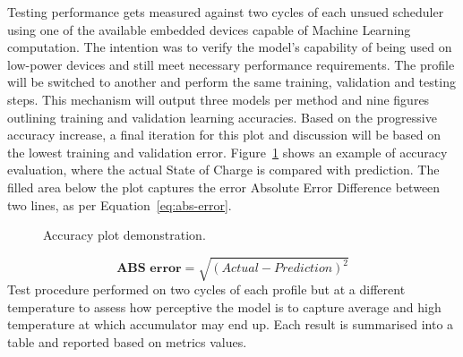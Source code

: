 %
Testing performance gets measured against two cycles of each unsued scheduler using one of the available embedded devices capable of Machine Learning computation.
The intention was to verify the model's capability of being used on low-power devices and still meet necessary performance requirements.
The profile will be switched to another and perform the same training, validation and testing steps.
This mechanism will output three models per method and nine figures outlining training and validation learning accuracies.
Based on the progressive accuracy increase, a final iteration for this plot and discussion will be based on the lowest training and validation error.
Figure~\ref{fig:plot_demo} shows an example of accuracy evaluation, where the actual State of Charge is compared with prediction.
The filled area below the plot captures the error Absolute Error Difference between two lines, as per Equation~\ref{eq:abs-error}.
\begin{figure}[ht]
    \centering
    
    \caption{Accuracy plot demonstration.}
    \label{fig:plot_demo}
\end{figure}
\begin{equation}
    \textbf{ABS error}  = \sqrt{(Actual-Prediction)^2}
    \label{eq:abs-error}
\end{equation}
Test procedure performed on two cycles of each profile but at a different temperature to assess how perceptive the model is to capture average and high temperature at which accumulator may end up.
Each result is summarised into a table and reported based on metrics values.
%
%
%

